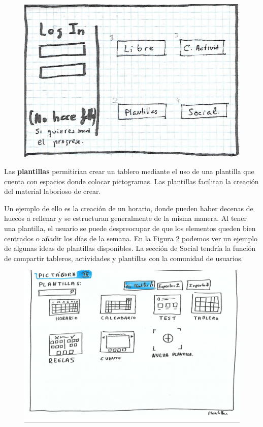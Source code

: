 \begin{figure}[h!]
	\centering
	\includegraphics[width=0.7\linewidth]{Imagenes/Bitmap/logInAlfonso}
	\caption{}
	\label{fig:loginalfonso}
\end{figure}

Las \textbf{plantillas} permitirían crear un tablero mediante el uso de una plantilla que cuenta con espacios donde colocar pictogramas. Las plantillas facilitan la creación del material laborioso de crear.

Un ejemplo de ello es la creación de un horario, donde pueden haber decenas de huecos a rellenar y se estructuran generalmente de la misma manera. Al tener una plantilla, el usuario se puede despreocupar de que los elementos queden bien centrados o añadir los días de la semana. En la Figura \ref{fig:inicioalfonso} podemos ver un ejemplo de algunas ideas de plantillas disponibles. La sección de Social tendría la función de compartir tableros, actividades y plantillas con la comunidad de usuarios.

\begin{figure}[h!]
	\centering
	\includegraphics[width=0.7\linewidth]{Imagenes/Bitmap/inicioAlfonso}
	\caption{}
	\label{fig:inicioalfonso}
\end{figure}


